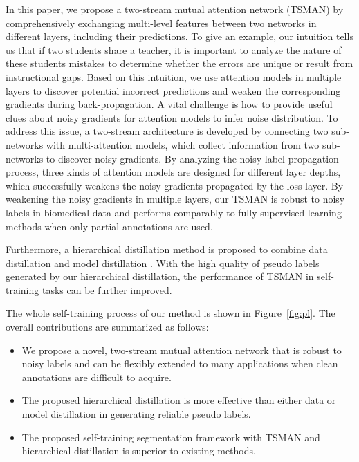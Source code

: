 \documentclass[letterpaper]{article} %
\begin{document}
In this paper, we propose a two-stream mutual attention network (TSMAN) by comprehensively exchanging multi-level features between two networks in different layers, including their predictions.
To give an example, our intuition tells us that if two students share a teacher, it is important to analyze the nature of these students mistakes to determine whether the errors are unique or result from instructional gaps.
Based on this intuition, we use attention models in multiple layers to discover potential incorrect predictions and weaken the corresponding gradients during back-propagation. 
A vital challenge is how to provide useful clues about noisy gradients for attention models to infer noise distribution.
To address this issue, a two-stream architecture is developed by connecting two sub-networks with multi-attention models, which collect information from two sub-networks to discover noisy gradients.
By analyzing the noisy label propagation process, three kinds of attention models are designed for different layer depths, which successfully weakens the noisy gradients propagated by the loss layer.
By weakening the noisy gradients in multiple layers, our TSMAN is robust to noisy labels in biomedical data and performs comparably to fully-supervised learning methods when only partial annotations are used.

Furthermore, a hierarchical distillation method is proposed to combine data distillation \cite{Radosavovic_2018_CVPR} and model distillation \cite{Hansen1990}.
With the high quality of pseudo labels generated by our hierarchical distillation, the performance of TSMAN in self-training tasks can be further improved.

The whole self-training process of our method is shown in Figure~\ref{fig:pl}.
The overall contributions are summarized as follows:
\begin{itemize}
\item We propose a novel, two-stream mutual attention network that is robust to noisy labels and can be flexibly extended to many applications when clean annotations are difficult to acquire.

\item The proposed hierarchical distillation is more effective than either data or model distillation in generating reliable pseudo labels.

\item The proposed self-training segmentation framework with TSMAN and hierarchical distillation is superior to existing methods.

\end{itemize}
\end{document}
